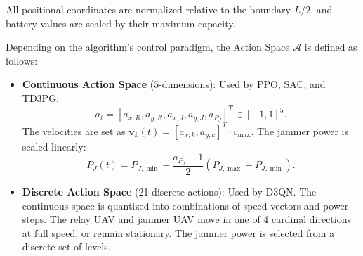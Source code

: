 \documentclass[journal,onecolumn]{IEEEtran}
\begin{document}
All positional coordinates are normalized relative to the boundary $L/2$, and battery values are scaled by their maximum capacity.

Depending on the algorithm's control paradigm, the Action Space $\mathcal{A}$ is defined as follows:
\begin{itemize}
    \item \textbf{Continuous Action Space} ($5$-dimensions): Used by PPO, SAC, and TD3PG.
    \begin{equation}
        a_t = \left[ a_{x,R}, a_{y,R}, a_{x,J}, a_{y,J}, a_{P_J} \right]^T \in [-1, 1]^5.
    \end{equation}
    The velocities are set as $\mathbf{v}_k(t) = [a_{x,k}, a_{y,k}]^T \cdot v_{\max}$. The jammer power is scaled linearly:
    \begin{equation}
        P_J(t) = P_{J,\min} + \frac{a_{P_J} + 1}{2} (P_{J,\max} - P_{J,\min}).
    \end{equation}
    
    \item \textbf{Discrete Action Space} (21 discrete actions): Used by D3QN. The continuous space is quantized into combinations of speed vectors and power steps. The relay UAV and jammer UAV move in one of 4 cardinal directions at full speed, or remain stationary. The jammer power is selected from a discrete set of levels.
\end{itemize}
\end{document}
